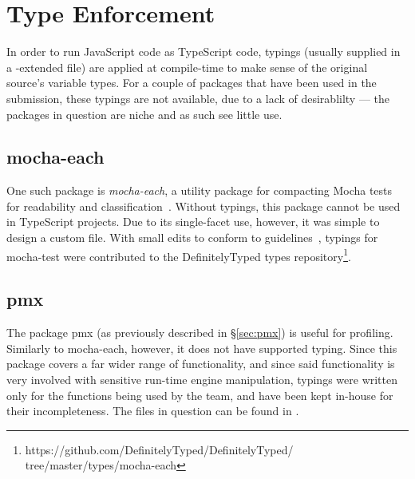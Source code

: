 \section{Type Enforcement}
In order to run JavaScript code as TypeScript code, typings (usually
supplied in a -extended file) are applied at compile-time to
make sense of the original source's variable types. For a couple of
packages that have been used in the submission, these typings are not
available, due to a lack of desirablilty --- the packages in question are
niche and as such see little use.

\subsection{mocha-each}
One such package is \emph{mocha-each}, a utility package for compacting
Mocha tests for readability and classification~\cite{mocha-each}. Without
typings, this package cannot be used in TypeScript projects. Due to its
single-facet use, however, it was simple to design a custom
 file. With small edits to conform to
guidelines~\cite{@types}, typings for
mocha-test were contributed to the DefinitelyTyped types repository\footnote{%
https://github.com/DefinitelyTyped/DefinitelyTyped/%
tree/master/types/mocha-each}.

\subsection{pmx}
The package pmx (as previously described in \S\ref{sec:pmx}) is useful for
profiling. Similarly to mocha-each, however, it does not have supported typing.
Since this package covers a far wider range of functionality, and since said
functionality is very involved with sensitive run-time engine manipulation,
typings were written only for the functions being used by the team, and have
been kept in-house for their incompleteness. The files in question can be found
in .
